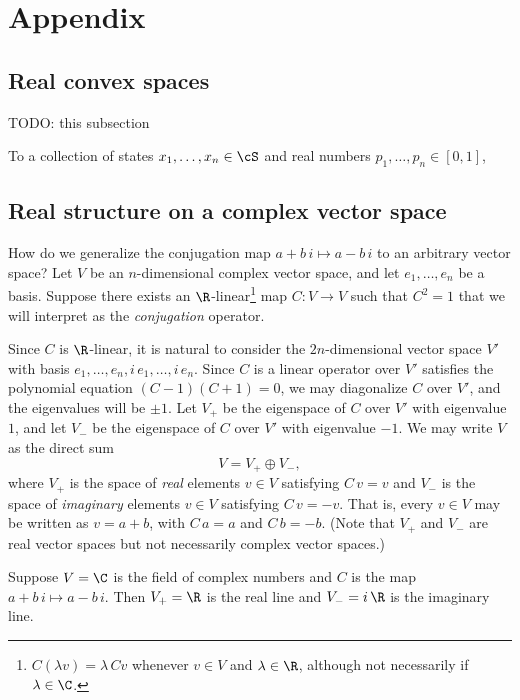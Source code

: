 \section{Appendix}
\subsection{Real convex spaces} \label{subsec:real_convex_space}
TODO: this subsection

To a collection of states $x_1, \dots, x_n \in \cS$ and real numbers $p_1, \dots, p_n \in [0, 1]$,

\subsection{Real structure on a complex vector space} \label{subsec:real_structure}
How do we generalize the conjugation map $a + b \, i \mapsto a - b \, i$ to an arbitrary vector space? Let $V$ be an $n$-dimensional complex vector space, and let $e_1, \dots, e_n$ be a basis. Suppose there exists an $\R$-linear\footnote{$C(\lambda v) = \lambda \, C v$ whenever $v \in V$ and $\lambda \in \R$, although not necessarily if $\lambda \in \C$.} map $C: V \to V$ such that $C^2 = 1$ that we will interpret as the \emph{conjugation} operator.

Since $C$ is $\R$-linear, it is natural to consider the $2n$-dimensional vector space $V'$ with basis $e_1, \dots, e_n, i \, e_1, \dots, i \, e_n$. Since $C$ is a linear operator over $V'$ satisfies the polynomial equation $(C - 1)(C + 1) = 0$, we may diagonalize $C$ over $V'$, and the eigenvalues will be $\pm 1$. Let $V_+$ be the eigenspace of $C$ over $V'$ with eigenvalue $1$, and let $V_-$ be the eigenspace of $C$ over $V'$ with eigenvalue $-1$. We may write $V$ as the direct sum
\begin{equation}
    V = V_+ \oplus V_-,
\end{equation}
where $V_+$ is the space of \emph{real} elements $v \in V$ satisfying $C \, v = v$ and $V_-$ is the space of \emph{imaginary} elements $v \in V$ satisfying $C \, v = -v$. That is, every $v \in V$ may be written as $v = a + b$, with $C \, a = a$ and $C \, b = -b$. (Note that $V_+$ and $V_-$ are real vector spaces but not necessarily complex vector spaces.)%

\begin{example}
Suppose $V = \C$ is the field of complex numbers and $C$ is the map $a + b \, i \mapsto a - b \, i$. Then $V_+ = \R$ is the real line and $V_- = i \, \R$ is the imaginary line.
\end{example}


